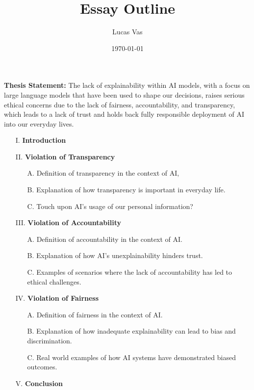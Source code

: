 \documentclass[12pt]{article}
\title{Essay Outline}
\author{Lucas Vas}
\date{\today}
\begin{document}
    \maketitle

    \noindent\textbf{Thesis Statement:} The lack of explainability within AI models, with a focus on large language models that have been used to shape our
    decisions, raises serious ethical concerns due to the lack of fairness, accountability, and transparency, which leads to a lack of trust and holds back
    fully responsible deployment of AI into our everyday lives.

    \begin{itemize}
        \item[I.] \textbf{Introduction}
        \item[II.] \textbf{Violation of Transparency}
        \begin{itemize}
            \item[A.] Definition of transparency in the context of AI,
            \item[B.] Explanation of how transparency is important in everyday life.
            \item[C.] Touch upon AI's usage of our personal information?
        \end{itemize}
        \item[III.] \textbf{Violation of Accountability}
        \begin{itemize}
            \item[A.] Definition of accountability in the context of AI.
            \item[B.] Explanation of how AI's unexplainability hinders trust.
            \item[C.] Examples of scenarios where the lack of accountability has led to ethical challenges.
        \end{itemize}
        \item[IV.] \textbf{Violation of Fairness}
        \begin{itemize}
            \item[A.] Definition of fairness in the context of AI.
            \item[B.] Explanation of how inadequate explainability can lead to bias and discrimination.
            \item[C.] Real world examples of how AI systems have demonstrated biased outcomes.
        \end{itemize}
        \item[V.] \textbf{Conclusion}
    \end{itemize}
\end{document}
